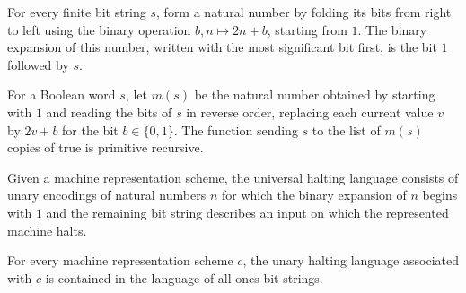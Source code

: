 \begin{theorem}
\label{Complexity.binaryExpansion_numOfString}
\leanok
{}
For every finite bit string $s$, form a natural number by folding its bits from right to
left using the binary operation $b,n\mapsto 2n+b$, starting from $1$. The binary
expansion of this number, written with the most significant bit first, is the bit $1$
followed by $s$.
\end{theorem}

\begin{lemma}
\label{Complexity.primrec_replicate_numOfString}
\leanok
{}
For a Boolean word $s$, let $m(s)$ be the natural number obtained by starting with $1$
and reading the bits of $s$ in reverse order, replacing each current value $v$ by $2v+b$
for the bit $b\in\{0,1\}$. The function sending $s$ to the list of $m(s)$ copies of true
is primitive recursive.
\end{lemma}

\begin{definition}
\label{Complexity.UHALT}
\leanok
{}
Given a machine representation scheme, the universal halting language consists of unary
encodings of natural numbers $n$ for which the binary expansion of $n$ begins with $1$
and the remaining bit string describes an input on which the represented machine halts.
\end{definition}

\begin{theorem}
\label{Complexity.UHALT_le_allOnes}
\leanok
{}
For every machine representation scheme $c$, the unary halting language associated with
$c$ is contained in the language of all-ones bit strings.
\end{theorem}

